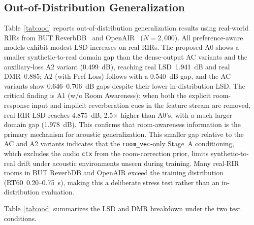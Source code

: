 \documentclass{aes2e}
\begin{document}
\subsection{Out-of-Distribution Generalization}
\label{sec:ood}

Table~\ref{tab:ood} reports out-of-distribution generalization results
using real-world RIRs from BUT ReverbDB~\cite{szoke2019} and OpenAIR~\cite{openair2010} ($N = 2{,}000$).
All preference-aware models exhibit modest LSD increases on real RIRs.
The proposed A0 shows a smaller synthetic-to-real domain gap than the
dense-output AC variants and the auxiliary-loss A2 variant (0.499~dB),
reaching real LSD~1.941~dB and real DMR~0.885; A2 (with Pref Loss)
follows with a 0.540~dB gap, and the AC variants show 0.646--0.706~dB
gaps despite their lower in-distribution LSD.
The critical finding is A1 (w/o Room Awareness): when both the explicit
room-response input and implicit reverberation cues in the feature stream
are removed, real-RIR LSD reaches 4.875~dB, 2.5$\times$ higher than A0's,
with a much larger domain gap (1.978~dB). This confirms that room-awareness
information is the primary mechanism for acoustic generalization.
This smaller gap relative to the AC and A2 variants indicates that the
\texttt{room\_vec}-only Stage~A conditioning, which excludes the audio
\texttt{ctx} from the room-correction prior, limits synthetic-to-real
drift under acoustic environments unseen during training.
Many real-RIR rooms in BUT ReverbDB and OpenAIR exceed the training
distribution (RT60~0.20--0.75~s), making this a deliberate stress test
rather than an in-distribution evaluation.

Table~\ref{tab:ood} summarizes the LSD and DMR breakdown under the two
test conditions.
\end{document}
